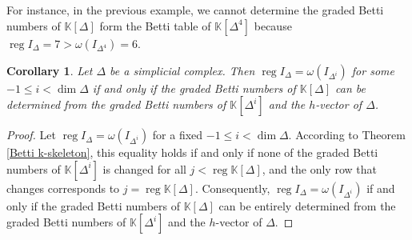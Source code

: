 \documentclass[a4paper,12pt]{amsart}
\numberwithin{equation}{section}
\newtheorem{corollary}[theorem]{Corollary}
\theoremstyle{definition}
\newcommand{\K}[0]{\mathbb{K}}
\DeclareMathOperator{\reg}{reg}
\begin{document}
For instance, in the previous example, we cannot determine the graded Betti numbers of $\K[\Delta]$ form the Betti table of $\K[\Delta^4]$ because $\reg I_{\Delta}=7>\omega(I_{\Delta^4})=6$.

\begin{corollary}\label{Betti deg}
	Let $\Delta$ be a simplicial complex. Then $\reg I_{\Delta}=\omega(I_{\Delta^i})$ for some $-1\le i<\dim\Delta$ if and only if the graded Betti numbers of $\K[\Delta]$ can be determined from the graded Betti numbers of $\K[\Delta^i]$ and the $h$-vector of $\Delta$.
\end{corollary}
\begin{proof}
	Let $\reg I_{\Delta}=\omega(I_{\Delta^i})$ for a fixed $-1\le i<\dim\Delta$. According to Theorem \ref{Betti k-skeleton}, this equality holds if and only if none of the graded Betti numbers of $\K[\Delta^i]$ is changed for all $j<\reg\K[\Delta]$, and the only row that changes corresponds to $j=\reg\K[\Delta]$. Consequently, $\reg I_{\Delta}=\omega(I_{\Delta^i})$ if and only if the graded Betti numbers of $\K[\Delta]$ can be entirely determined from the graded Betti numbers of $\K[\Delta^i]$ and the $h$-vector of $\Delta$.
\end{proof}
\end{document}
